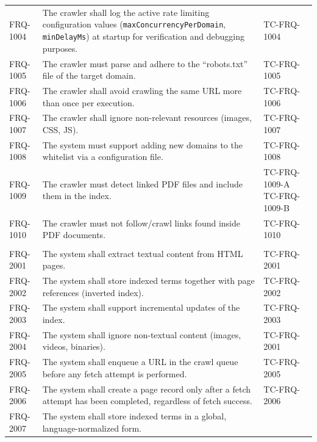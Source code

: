 \documentclass{article}
\begin{document}
\begin{longtable}{@{}p{1.7cm} p{9cm} p{4.5cm}@{}}
FRQ-1004 & The crawler shall log the active rate limiting configuration values (\texttt{maxConcurrencyPerDomain}, \texttt{minDelayMs}) at startup for verification and debugging purposes. & TC-FRQ-1004 \\
FRQ-1005 & The crawler must parse and adhere to the ``robots.txt'' file of the target domain. & TC-FRQ-1005 \\


FRQ-1006 & The crawler shall avoid crawling the same URL more than once per execution. & TC-FRQ-1006 \\

FRQ-1007 & The crawler shall ignore non-relevant resources (images, CSS, JS). & TC-FRQ-1007\\

FRQ-1008 & The system must support adding new domains to the whitelist via a configuration file. & TC-FRQ-1008\\

FRQ-1009 & The crawler must detect linked PDF files and include them in the index. & TC-FRQ-1009-A \newline TC-FRQ-1009-B \\

FRQ-1010 & The crawler must not follow/crawl links found inside PDF documents. & TC-FRQ-1010\\
\newpage


\midrule
\multicolumn{3}{l}{\textbf{\textit{Indexing (2000 Series)}}} \\
\midrule
FRQ-2001 & The system shall extract textual content from HTML pages. & TC-FRQ-2001\\
FRQ-2002 & The system shall store indexed terms together with page references (inverted index). & TC-FRQ-2002\\
FRQ-2003 & The system shall support incremental updates of the index. & TC-FRQ-2003 \\
FRQ-2004 & The system shall ignore non-textual content (images, videos, binaries). & TC-FRQ-2001\\
FRQ-2005 & The system shall enqueue a URL in the crawl queue before any fetch attempt is performed. & TC-FRQ-2005 \\
FRQ-2006 & The system shall create a page record only after a fetch attempt has been completed, regardless of fetch success. & TC-FRQ-2006 \\
FRQ-2007 & The system shall store indexed terms in a global, language-normalized form. & \\


\end{longtable}
\end{document}
